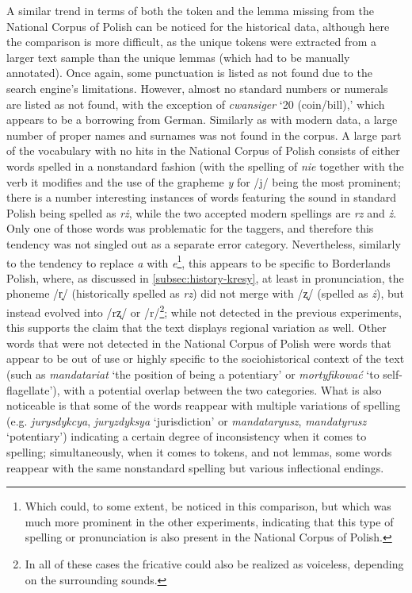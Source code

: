 A similar trend in terms of both the token and the lemma missing from the National Corpus of Polish can be noticed for the historical data, although here the comparison is more difficult, as the unique tokens were extracted from a larger text sample than the unique lemmas (which had to be manually annotated). Once again, some punctuation is listed as not found due to the search engine's limitations. However, almost no standard numbers or numerals are listed as not found, with the exception of \textit{cwansiger} `20 (coin/bill),' which appears to be a borrowing from German. Similarly as with modern data, a large number of proper names and surnames was not found in the corpus. A large part of the vocabulary with no hits in the National Corpus of Polish consists of either words spelled in a nonstandard fashion (with the spelling of \textit{nie} together with the verb it modifies and the use of the grapheme \textit{y} for /j/ being the most prominent; there is a number interesting instances of words featuring the sound \textipa{/\textrtailz/} in standard Polish being spelled as \textit{rż}, while the two accepted modern spellings are \textit{rz} and \textit{ż}. Only one of those words was problematic for the taggers, and therefore this tendency was not singled out as a separate error category. Nevertheless, similarly to the tendency to replace \textit{a} with \textit{e}\footnote{Which could, to some extent, be noticed in this comparison, but which was much more prominent in the other experiments, indicating that this type of spelling or pronunciation is also present in the National Corpus of Polish.}, this appears to be specific to Borderlands Polish, where, as discussed in \autoref{subsec:history-kresy}, at least in pronunciation, the phoneme /r̝/ (historically spelled as \textit{rz}) did not merge with /ʐ/ (spelled as \textit{ż}), but instead evolved into /rʐ/ or /r/\footnote{In all of these cases the fricative could also be realized as voiceless, depending on the surrounding sounds.}; while not detected in the previous experiments, this supports the claim that the text displays regional variation as well. Other words that were not detected in the National Corpus of Polish were words that appear to be out of use or highly specific to the sociohistorical context of the text (such as \textit{mandatariat} `the position of being a potentiary' or \textit{mortyfikować} `to self-flagellate'), with a potential overlap between the two categories. What is also noticeable is that some of the words reappear with multiple variations of spelling (e.g. \textit{jurysdykcya}, \textit{juryzdyksya} `jurisdiction' or \textit{mandataryusz}, \textit{mandatyrusz} `potentiary') indicating a certain degree of inconsistency when it comes to spelling; simultaneously, when it comes to tokens, and not lemmas, some words reappear with the same nonstandard spelling but various inflectional endings. 


